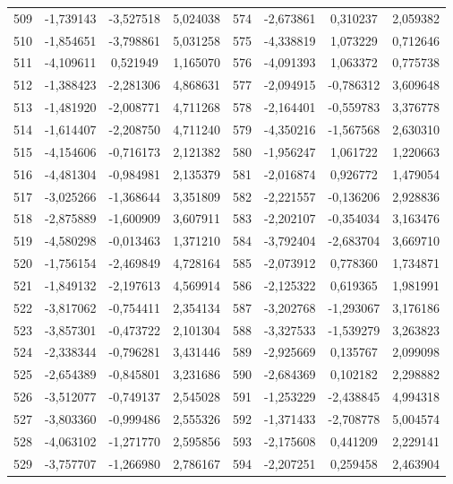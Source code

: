 \begin{apendicesenv}
\begin{table}[H]
\begin{tabular}{c c c c c c c c}
		509 & -1,739143 & -3,527518 & 5,024038 & 574 & -2,673861 & 0,310237 & 2,059382 \\
		510 & -1,854651 & -3,798861 & 5,031258 & 575 & -4,338819 & 1,073229 & 0,712646 \\
		511 & -4,109611 & 0,521949 & 1,165070 & 576 & -4,091393 & 1,063372 & 0,775738 \\
		512 & -1,388423 & -2,281306 & 4,868631 & 577 & -2,094915 & -0,786312 & 3,609648 \\
		513 & -1,481920 & -2,008771 & 4,711268 & 578 & -2,164401 & -0,559783 & 3,376778 \\
		514 & -1,614407 & -2,208750 & 4,711240 & 579 & -4,350216 & -1,567568 & 2,630310 \\
		515 & -4,154606 & -0,716173 & 2,121382 & 580 & -1,956247 & 1,061722 & 1,220663 \\
		516 & -4,481304 & -0,984981 & 2,135379 & 581 & -2,016874 & 0,926772 & 1,479054 \\
		517 & -3,025266 & -1,368644 & 3,351809 & 582 & -2,221557 & -0,136206 & 2,928836 \\
		518 & -2,875889 & -1,600909 & 3,607911 & 583 & -2,202107 & -0,354034 & 3,163476 \\
		519 & -4,580298 & -0,013463 & 1,371210 & 584 & -3,792404 & -2,683704 & 3,669710 \\
		520 & -1,756154 & -2,469849 & 4,728164 & 585 & -2,073912 & 0,778360 & 1,734871 \\
		521 & -1,849132 & -2,197613 & 4,569914 & 586 & -2,125322 & 0,619365 & 1,981991 \\
		522 & -3,817062 & -0,754411 & 2,354134 & 587 & -3,202768 & -1,293067 & 3,176186 \\
		523 & -3,857301 & -0,473722 & 2,101304 & 588 & -3,327533 & -1,539279 & 3,263823 \\
		524 & -2,338344 & -0,796281 & 3,431446 & 589 & -2,925669 & 0,135767 & 2,099098 \\
		525 & -2,654389 & -0,845801 & 3,231686 & 590 & -2,684369 & 0,102182 & 2,298882 \\
		526 & -3,512077 & -0,749137 & 2,545028 & 591 & -1,253229 & -2,438845 & 4,994318 \\
		527 & -3,803360 & -0,999486 & 2,555326 & 592 & -1,371433 & -2,708778 & 5,004574 \\
		528 & -4,063102 & -1,271770 & 2,595856 & 593 & -2,175608 & 0,441209 & 2,229141 \\
		529 & -3,757707 & -1,266980 & 2,786167 & 594 & -2,207251 & 0,259458 & 2,463904 \\

\end{tabular}
\end{table}
\end{apendicesenv}
